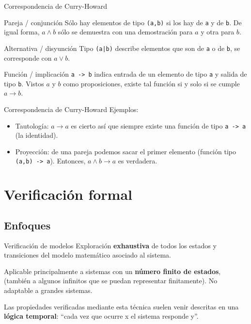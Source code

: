 \begin{frame}{Correspondencia de Curry-Howard}

\begin{exampleblock}{Pareja / conjunción}
Sólo hay elementos de tipo \texttt{(a,b)} si los hay de \texttt a y de \texttt b. De igual forma, $a\wedge b$ sólo se demuestra con una demostración para $a$ y otra para $b$.
\end{exampleblock}

\pause

\begin{exampleblock}{Alternativa / disyunción}
Tipo \texttt{(a|b)} describe elementos que son de \texttt a o de \texttt b, se corresponde con $a\vee b$.
\end{exampleblock}

\pause

\begin{exampleblock}{Función / implicación}
\texttt{a -> b} indica entrada de un elemento de tipo \texttt a y salida de tipo \texttt b. Vistos $a$ y $b$ como proposiciones, existe tal función si y solo si se cumple $a\rightarrow b$.
\end{exampleblock}

\end{frame}

\begin{frame}{Correspondencia de Curry-Howard}
Ejemplos:
\begin{itemize}
\item Tautología: $a\rightarrow a$ es cierto así que siempre existe una función de tipo \texttt{a -> a} (la identidad).
\item Proyección: de una pareja podemos sacar el primer elemento (función tipo \texttt{(a,b) -> a}). Entonces, $a\wedge b\rightarrow a$ es verdadera.
\end{itemize}

\end{frame}

\section{Verificación formal}
\subsection{Enfoques}

\begin{frame}{Verificación de modelos}
Exploración \textbf{exhaustiva} de todos los
estados y transiciones del modelo matemático asociado al sistema.

Aplicable principalmente a sistemas con un \textbf{número finito de estados}, (también a algunos infinitos que se puedan representar finitamente). No adaptable a grandes sistemas.

Las propiedades verificadas mediante esta técnica suelen venir descritas en una \textbf{lógica temporal}:
``cada vez que ocurre x el sistema responde y''.
\end{frame}

